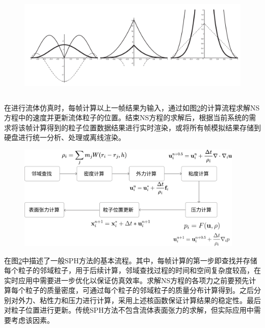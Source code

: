 \begin{figure}[ht]
 \centering
 \includegraphics[height=5cm]{image/threekernel.png}
 \label{fig:threekernel}
\end{figure}




在进行流体仿真时，每帧计算以上一帧结果为输入，通过如图\ref{fig:pipeline1}的计算流程求解NS方程中的速度并更新流体粒子的位置。结束NS方程的求解后，根据当前系统的需求将该帧计算得到的粒子位置数据结果进行实时渲染，或将所有帧模拟结果存储到硬盘进行统一分析、处理或离线渲染。

\begin{figure}[ht]
 \centering
 \includegraphics[height=5cm]{image/pic1.png}
 \label{fig:pipeline1}
\end{figure}

在图\ref{fig:pipeline1}中描述了一般SPH方法的基本流程。其中，每帧计算的第一步即查找并存储每个粒子的邻域粒子，用于后续计算，邻域查找过程的时间和空间复杂度较高，在实时应用中需要进一步优化以保证仿真效率。求解NS方程的各项力之前要预先计算每个粒子的质量密度，可通过每个粒子的邻域粒子的质量分布计算得到。之后分别对外力、粘性力和压力进行计算，采用上述核函数保证计算结果的稳定性。最后对粒子位置进行更新。传统SPH方法不包含流体表面张力的求解，但实际应用中需要考虑该因素。

